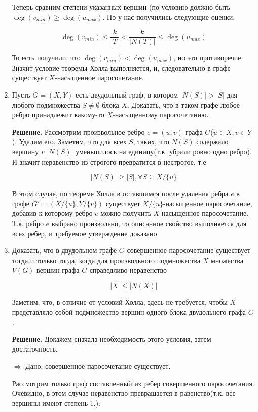\documentclass[fleqn]{article}
\begin{document}
\begin{enumerate}
	Теперь сравним степени указанных вершин (по условию должно быть $\deg(v_{min}) \geqslant \deg(u_{max})$. Но у нас получились следующие оценки:
	
	$$\deg(v_{min}) \leqslant \frac{k}{|T|} < \frac{k}{|N(T)|} \leqslant \deg(u_{max})$$
	
	То есть получили, что $\deg(v_{min}) < \deg(u_{max})$, но это противоречие. Значит условие теоремы Холла выполняется, и, следовательно в графе существует $X$-насыщенное паросочетание.
	
	\item Пусть $G = (X, Y)$ есть двудольный граф, в котором $|N(S)| > |S|$ для любого подмножества $S \neq \emptyset$	блока $X$. Доказать, что в таком графе любое ребро принадлежит какому-то $X$-насыщенному паросочетанию.
	
	\textbf{Решение.} Рассмотрим произвольное ребро $e = (u, v)$ графа $G$($u\in X, v \in Y$). Удалим его. Заметим, что для всех $S$, таких, что $N(S)$ содержало вершину $v$ $|N(S)|$ уменьшилось на единицу(т.к. убрали ровно одно ребро). И значит неравенство из строгого превратится в нестрогое, т.е 
	
	$$|N(S)| \geqslant |S|, \forall S \subseteq X/\{u\}$$
	
	В этом случае, по теореме Холла в оставшимся после удаления ребра $e$ в графе $G' = (X / \{u\}, Y / \{v\})$ существует $X / \{u\}$-насыщенное паросочетание, добавив к которому ребро $e$ можно получить $X$-насыщенное паросочетание. Т.к. ребро $e$ выбрано произвольно, то описанное свойство выполняется для всех ребер, и требуемое утверждение доказано.
	
	\item Доказать, что в двудольном графе $G$ совершенное паросочетание существует тогда и только тогда,
	когда для произвольного подмножества $X$ множества $V(G)$ вершин графа $G$ справедливо неравенство
	
	$$|X| \leqslant |N(X)|$$
	
	Заметим, что, в отличие от условий Холла, здесь не требуется, чтобы $X$ представляло собой
	подмножество вершин одного блока двудольного графа $G$.
	
	\textbf{Решение.}
	Докажем сначала необходимость этого условия, затем достаточность.
	
	$\Rightarrow$ Дано: совершенное паросочетание существует.
	
	Рассмотрим только граф составленный из ребер совершенного паросочетания. Очевидно, в этом случае неравенство превращается в равенство(т.к. все вершины имеют степень 1.): 
	

\end{enumerate}
\end{document}
